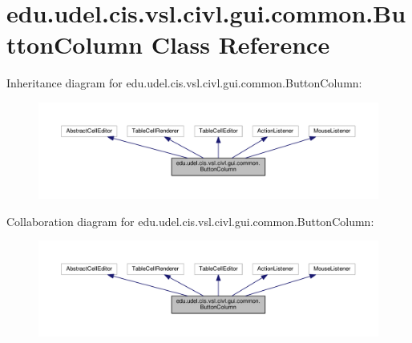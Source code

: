 \hypertarget{classedu_1_1udel_1_1cis_1_1vsl_1_1civl_1_1gui_1_1common_1_1ButtonColumn}{}\section{edu.\+udel.\+cis.\+vsl.\+civl.\+gui.\+common.\+Button\+Column Class Reference}
\label{classedu_1_1udel_1_1cis_1_1vsl_1_1civl_1_1gui_1_1common_1_1ButtonColumn}


Inheritance diagram for edu.\+udel.\+cis.\+vsl.\+civl.\+gui.\+common.\+Button\+Column\+:
\nopagebreak
\begin{figure}[H]
\begin{center}
\leavevmode
\includegraphics[width=350pt]{classedu_1_1udel_1_1cis_1_1vsl_1_1civl_1_1gui_1_1common_1_1ButtonColumn__inherit__graph}
\end{center}
\end{figure}


Collaboration diagram for edu.\+udel.\+cis.\+vsl.\+civl.\+gui.\+common.\+Button\+Column\+:
\nopagebreak
\begin{figure}[H]
\begin{center}
\leavevmode
\includegraphics[width=350pt]{classedu_1_1udel_1_1cis_1_1vsl_1_1civl_1_1gui_1_1common_1_1ButtonColumn__coll__graph}
\end{center}
\end{figure}
